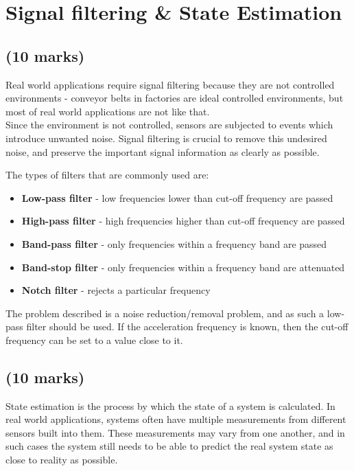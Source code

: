 \section{Signal filtering \& State Estimation}

\subsection{(10 marks)}

Real world applications require signal filtering because they are not controlled environments - conveyor belts in factories are ideal controlled environments, but most of real world applications are not like that.\\
Since the environment is not controlled, sensors are subjected to events which introduce unwanted noise. Signal filtering is crucial to remove this undesired noise, and preserve the important signal information as clearly as possible.

The types of filters that are commonly used are:

\begin{itemize}
    \item \textbf{Low-pass filter} - low frequencies lower than cut-off frequency are passed
    \item \textbf{High-pass filter} - high frequencies higher than cut-off frequency are passed
    \item \textbf{Band-pass filter} - only frequencies within a frequency band are passed
    \item \textbf{Band-stop filter} - only frequencies within a frequency band are attenuated
    \item \textbf{Notch filter} - rejects a particular frequency
\end{itemize}

The problem described is a noise reduction/removal problem, and as such a low-pass filter should be used. If the acceleration frequency is known, then the cut-off frequency can be set to a value close to it.


\subsection{(10 marks)}

State estimation is the process by which the state of a system is calculated. In real world applications, systems often have multiple measurements from different sensors built into them. These measurements may vary from one another, and in such cases the system still needs to be able to  predict the real system state as close to reality as possible.


